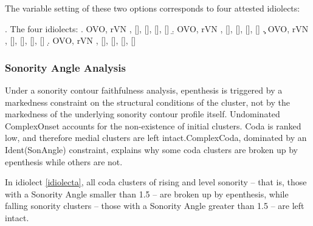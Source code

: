 \documentclass[12pt]{article}
\newcommand{\tickYes}{\checkmark}
\newcommand{\tickNo}{\hspace{1pt}\ding{55}}
\begin{document}
The variable setting of these two options corresponds to four attested idiolects:

  \ex. \label{idiolects} The four idiolects: \citep[(43)]{rose.2000}
       \a. \label{idiolecta} \tickYes OVO, \tickNo rVN \newline %
           [\textipa{k1rm}], [], [], [], []
       \b. \label{idiolectb} \tickYes OVO, \tickYes rVN \newline %
           [\textipa{k1r1m}], [], [], [], []
       \c. \label{idiolectc} \tickNo OVO, \tickNo rVN \newline %
           [\textipa{k1rm}], [], [], [], []
       \d. \label{idiolectd} \tickNo OVO, \tickYes rVN \newline %
           [\textipa{k1r1m}], [], [], [], []


\subsubsection{Sonority Angle Analysis}

Under a sonority contour faithfulness analysis, epenthesis is triggered by a markedness constraint on the structural conditions of the cluster, not by the markedness of the underlying sonority contour profile itself. Undominated {\sc *ComplexOnset} accounts for the non-existence of initial clusters. {\sc *Coda} is ranked low, and therefore medial clusters are left intact.{\sc *ComplexCoda}, dominated by an {\sc Ident(SonAngle)} constraint, explains why some coda clusters are broken up by epenthesis while others are not.

In idiolect \ref{idiolecta}, all coda clusters of rising and level sonority -- that is, those with a {\sc Sonority Angle} smaller than 1.5 -- are broken up by epenthesis, while falling sonority clusters -- those with a {\sc Sonority Angle} greater than 1.5 -- are left intact. 
\end{document}
